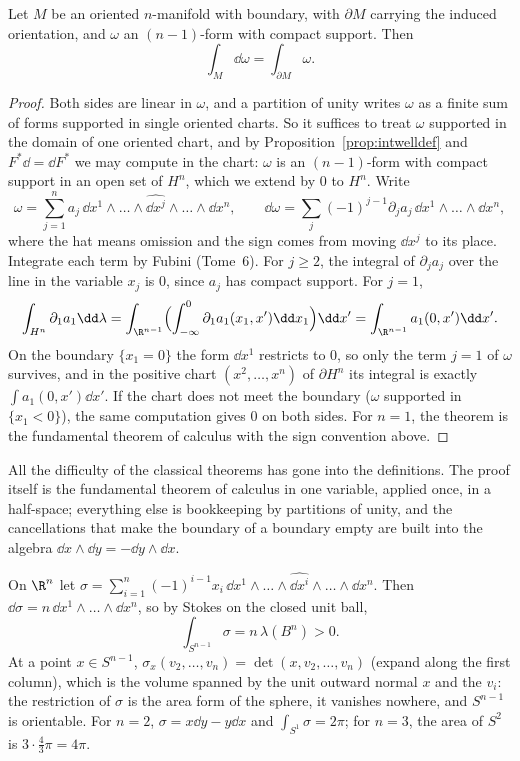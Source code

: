 \begin{theorem}[Stokes]\label{thm:stokes}
Let $M$ be an oriented $n$-manifold with boundary, with $\partial M$ carrying the induced orientation, and $\omega$ an $(n-1)$-form with compact support. Then
\[
\int_M\dd\omega=\int_{\partial M}\omega.
\]
\end{theorem}
\begin{proof}
Both sides are linear in $\omega$, and a partition of unity writes $\omega$ as a finite sum of forms supported in single oriented charts. So it suffices to
treat $\omega$ supported in the domain of one oriented chart, and by Proposition~\ref{prop:intwelldef} and $F^*\dd=\dd F^*$ we may compute in the chart: $\omega$ is an
$(n-1)$-form with compact support in an open set of $H^n$, which we extend by $0$ to $H^n$. Write
\[
\omega=\sum_{j=1}^na_j\,\dd x^1\wedge\dots\wedge\widehat{\dd x^j}\wedge\dots\wedge\dd x^n,\qquad\dd\omega=\sum_j(-1)^{j-1}\partial_ja_j\,\dd x^1\wedge\dots\wedge\dd x^n,
\]
where the hat means omission and the sign comes from moving $\dd x^j$ to its place. Integrate each term by Fubini (Tome~6). For $j\ge2$, the integral of
$\partial_ja_j$ over the line in the variable $x_j$ is $0$, since $a_j$ has compact support. For $j=1$,
\[
\int_{H^n}\partial_1a_1\dd\lambda=\int_{\R^{n-1}}\Bigl(\int_{-\infty}^0\partial_1a_1(x_1,x')\dd x_1\Bigr)\dd x'=\int_{\R^{n-1}}a_1(0,x')\dd x'.
\]
On the boundary $\{x_1=0\}$ the form $\dd x^1$ restricts to $0$, so only the term $j=1$ of $\omega$ survives, and in the positive chart $(x^2,\dots,x^n)$ of $\partial H^n$
its integral is exactly $\int a_1(0,x')\dd x'$. If the chart does not meet the boundary ($\omega$ supported in $\{x_1<0\}$), the same computation gives $0$ on
both sides. For $n=1$, the theorem is the fundamental theorem of calculus with the sign convention above.
\end{proof}

\begin{beauty}
All the difficulty of the classical theorems has gone into the definitions. The proof itself is the fundamental theorem of calculus in one variable,
applied once, in a half-space; everything else is bookkeeping by partitions of unity, and the cancellations that make the boundary of a boundary empty are
built into the algebra $\dd x\wedge\dd y=-\dd y\wedge\dd x$.
\end{beauty}

\begin{example}\label{ex:sigma}
On $\R^n$ let $\sigma=\sum_{i=1}^n(-1)^{i-1}x_i\,\dd x^1\wedge\dots\wedge\widehat{\dd x^i}\wedge\dots\wedge\dd x^n$. Then $\dd\sigma=n\,\dd x^1\wedge\dots\wedge\dd x^n$, so by Stokes on the closed unit
ball,
\[
\int_{S^{n-1}}\sigma=n\,\lambda(B^n)>0.
\]
At a point $x\in S^{n-1}$, $\sigma_x(v_2,\dots,v_n)=\det(x,v_2,\dots,v_n)$ (expand along the first column), which is the volume spanned by the unit outward normal $x$ and
the $v_i$: the restriction of $\sigma$ is the area form of the sphere, it vanishes nowhere, and $S^{n-1}$ is orientable. For $n=2$, $\sigma=x\dd y-y\dd x$ and
$\int_{S^1}\sigma=2\pi$; for $n=3$, the area of $S^2$ is $3\cdot\frac43\pi=4\pi$.
\end{example}

